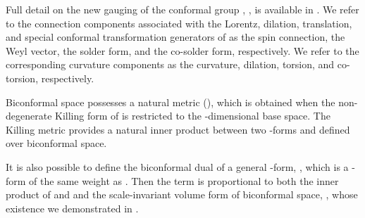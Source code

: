 \documentclass[a4paper,a4paper]{article}
\begin{document}
Full detail on the new gauging of the conformal group \coordHE{}, \coordHE{}, is
available in \cite{New Conformal Gauging Paper}. We refer to the connection
components associated with the Lorentz, dilation, translation, and special
conformal transformation generators of \coordHE{} as the spin connection, the
Weyl vector, the solder form, and the co-solder form, respectively. We refer
to the corresponding \coordHE{} curvature components as the curvature,
dilation, torsion, and co-torsion, respectively.

Biconformal space possesses a natural metric \coordHE{} (\coordHE{}),
which is obtained when the non-degenerate Killing form of \coordHE{} is
restricted to the \coordHE{}-dimensional base space. The Killing metric provides a
natural inner product between two \coordHE{}-forms \coordHE{} and \coordHE{}
defined over biconformal space.

It is also possible to define the biconformal dual of a general \coordHE{}-form, \coordHE{}, which is a \coordHE{}-form of the same weight as \coordHE{}. Then the term \coordHE{} is proportional to both the inner product of \coordHE{} and \coordHE{} and the scale-invariant volume form of biconformal space, \myHighlight{$%
\mathbf{\Phi }$}\coordHE{}, whose existence we demonstrated in \cite{WW}.
\end{document}
